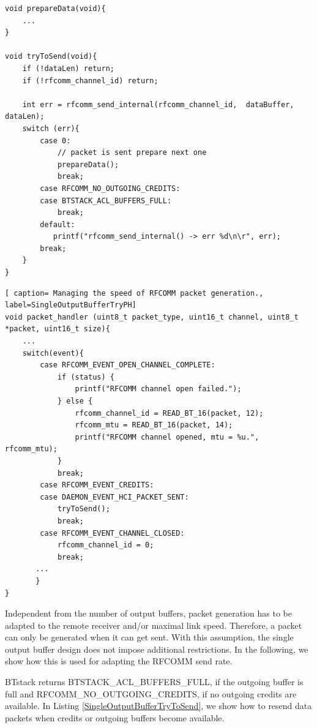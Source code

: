 \documentclass[a4paper,titlepage,oneside,12pt]{amsart} %
\begin{document}
\noindent\begin{minipage}{\textwidth}
\begin{lstlisting}[caption=Preparing and sending data., label=SingleOutputBufferTryToSend]
void prepareData(void){
    ...
}

void tryToSend(void){
    if (!dataLen) return;
    if (!rfcomm_channel_id) return;
    
    int err = rfcomm_send_internal(rfcomm_channel_id,  dataBuffer, dataLen);
    switch (err){
        case 0:
            // packet is sent prepare next one
            prepareData();
            break;
        case RFCOMM_NO_OUTGOING_CREDITS:
        case BTSTACK_ACL_BUFFERS_FULL:
            break;
        default:
           printf("rfcomm_send_internal() -> err %d\n\r", err);
        break;
    }
}
\end{lstlisting}
\begin{lstlisting}[ caption= Managing the speed of RFCOMM packet generation., label=SingleOutputBufferTryPH]
void packet_handler (uint8_t packet_type, uint16_t channel, uint8_t *packet, uint16_t size){
    ...
    switch(event){
        case RFCOMM_EVENT_OPEN_CHANNEL_COMPLETE:
            if (status) {
                printf("RFCOMM channel open failed.");
            } else {
                rfcomm_channel_id = READ_BT_16(packet, 12);
                rfcomm_mtu = READ_BT_16(packet, 14);
                printf("RFCOMM channel opened, mtu = %u.", rfcomm_mtu);
            }
            break;
        case RFCOMM_EVENT_CREDITS:
        case DAEMON_EVENT_HCI_PACKET_SENT:
            tryToSend();
            break;
        case RFCOMM_EVENT_CHANNEL_CLOSED:
            rfcomm_channel_id = 0;
            break;
       ...
       }
}
\end{lstlisting}
\end{minipage}

Independent from the number of output buffers, packet generation has to be adapted to the remote receiver and/or maximal link speed. Therefore, a packet can only be generated when it can get sent. With this assumption, the single output buffer design does not impose additional restrictions. In the following, we show how this is used for adapting the RFCOMM send rate. 

BTstack returns BTSTACK\_ACL\_BUFFERS\_FULL, if the outgoing buffer is full and RFCOMM\_NO\_OUTGOING\_CREDITS, if no outgoing credits are available. In Listing \ref{SingleOutputBufferTryToSend}, we show how to resend data packets when credits or outgoing buffers become available.
\end{document}

